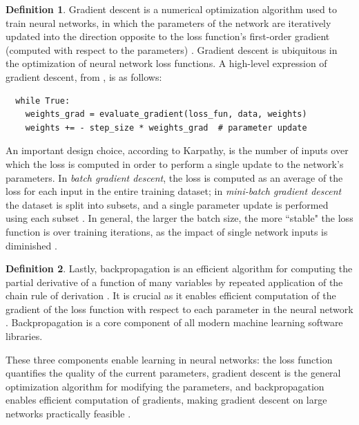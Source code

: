 \documentclass[12pt, titlepage]{report}
\theoremstyle{definition}
\newtheorem{definition}{Definition}
\begin{document}
\begin{definition}
Gradient descent is a numerical optimization algorithm used to train neural networks, in which the parameters of the network are iteratively updated into the direction opposite to the loss function's first-order gradient (computed with respect to the parameters) \cite[Optimization: Stochastic Gradient Descent]{karpathy2017cs231n}. Gradient descent is ubiquitous in the optimization of neural network loss functions. A high-level expression of gradient descent, from \cite{karpathy2017cs231n}, is as follows:

\begin{verbatim}
  while True:
    weights_grad = evaluate_gradient(loss_fun, data, weights)
    weights += - step_size * weights_grad  # parameter update
\end{verbatim}
\end{definition}

An important design choice, according to Karpathy, is the number of inputs over which the loss is computed in order to perform a single update to the network's parameters. In \emph{batch gradient descent}, the loss is computed as an average of the loss for each input in the entire training dataset; in \emph{mini-batch gradient descent} the dataset is split into subsets, and a single parameter update is performed using each subset \cite[Optimization: Stochastic Gradient Descent]{karpathy2017cs231n}. In general, the larger the batch size, the more ``stable" the loss function is over training iterations, as the impact of single network inputs is diminished \cite[Neural Networks Part 3: Learning and Evaluation]{karpathy2017cs231n}. 

\begin{definition}
Lastly, backpropagation is an efficient algorithm for computing the partial derivative of a function of many variables by repeated application of the chain rule of derivation \cite[Backpropagation, Intuitions]{karpathy2017cs231n}. It is crucial as it enables efficient computation of the gradient of the loss function with respect to each parameter in the neural network \cite[Backpropagation, Intuitions]{karpathy2017cs231n}. Backpropagation is a core component of all modern machine learning software libraries.
\end{definition}

These three components enable learning in neural networks: the loss function quantifies the quality of the current parameters, gradient descent is the general optimization algorithm for modifying the parameters, and backpropagation enables efficient computation of gradients, making gradient descent on large networks practically feasible \cite[Optimization: Stochastic Gradient Descent]{karpathy2017cs231n}.
\end{document}
